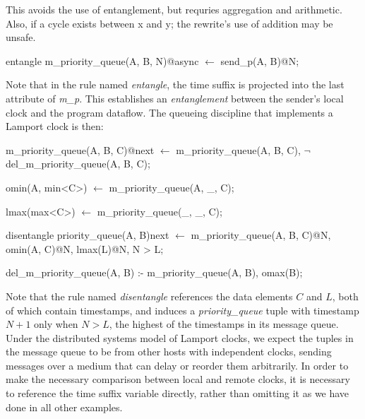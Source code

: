 This avoids the use of entanglement, but requries aggregation and
arithmetic.  Also, if a cycle exists between x and y; the rewrite's
use of addition may be unsafe.


\begin{Dedalus}
entangle
m\_priority\_queue(A, B, N)@async \(\leftarrow\)
  send\_p(A, B)@N;
\end{Dedalus}

Note that in the rule named \emph{entangle}, the time suffix is projected into the last attribute of \emph{m\_p}.  
This establishes an \emph{entanglement} between
the sender's local clock and the program dataflow.  The queueing discipline that implements a
Lamport clock is then:

\begin{Dedalus}

m\_priority\_queue(A, B, C)@next \(\leftarrow\)
  m\_priority\_queue(A, B, C),
  \(\lnot\) del\_m\_priority\_queue(A, B, C);

omin(A, min<C>) \(\leftarrow\)
  m\_priority\_queue(A, _, C);

lmax(max<C>) \(\leftarrow\)
  m\_priority\_queue(_, _, C);

disentangle
priority\_queue(A, B)next \(\leftarrow\)
  m\_priority\_queue(A, B, C)@N,
  omin(A, C)@N,
  lmax(L)@N,
  N > L;

del\_m\_priority\_queue(A, B) :-
  m\_priority\_queue(A, B),
  omax(B);
  
\end{Dedalus}

Note that the rule named \emph{disentangle} references the data elements $C$ and $L$, both of which
contain timestamps, and induces a \emph{priority\_queue} tuple with timestamp $N+1$ only when $N > L$,
the highest of the timestamps in its message queue.  Under the distributed systems model of Lamport clocks, 
we expect the tuples in the message queue to  be from other hosts with independent clocks, sending messages 
over a medium that can delay or reorder them arbitrarily.  In order to make the necessary comparison between local
and remote clocks, it is necessary to reference the time suffix variable directly, rather than omitting it as we have done 
in all other \lang examples.



